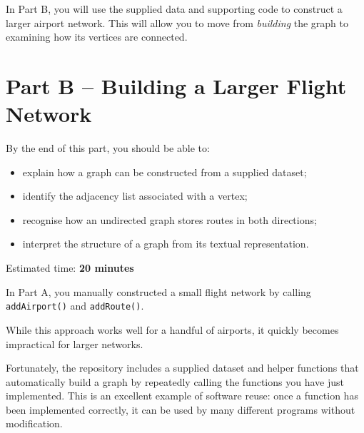 \documentclass{csc2059practical}
\begin{document}
In Part B, you will use the supplied data and supporting code to construct a
larger airport network. This will allow you to move from \emph{building} the
graph to examining how its vertices are connected.
\clearpage


\section{Part B -- Building a Larger Flight Network}

\begin{learningoutcomes}
By the end of this part, you should be able to:

\begin{itemize}
    \item explain how a graph can be constructed from a supplied dataset;
    \item identify the adjacency list associated with a vertex;
    \item recognise how an undirected graph stores routes in both directions;
    \item interpret the structure of a graph from its textual representation.
\end{itemize}
\end{learningoutcomes}

\begin{infobox}
Estimated time: \textbf{20 minutes}
\end{infobox}

In Part A, you manually constructed a small flight network by calling
\texttt{addAirport()} and \texttt{addRoute()}.

While this approach works well for a handful of airports, it quickly becomes
impractical for larger networks.

Fortunately, the repository includes a supplied dataset and helper functions
that automatically build a graph by repeatedly calling the functions you have
just implemented. This is an excellent example of software reuse: once a
function has been implemented correctly, it can be used by many different
programs without modification.

\end{document}
